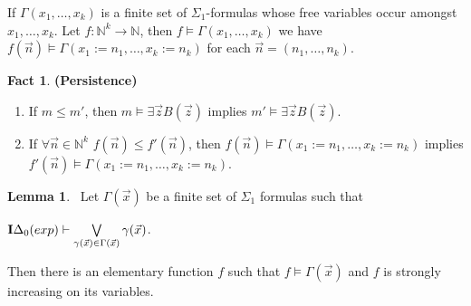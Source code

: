 \documentclass[8pt]{article}
\theoremstyle{definition}
\theoremstyle{definition}
\theoremstyle{definition}
\theoremstyle{definition}
\theoremstyle{definition}
\theoremstyle{definition}
\theoremstyle{definition}
\theoremstyle{definition}
\newtheorem{lemma}{Lemma}[section]
\theoremstyle{definition}
\newtheorem{fact}{Fact}[section]
\theoremstyle{definition}
\theoremstyle{definition}
\theoremstyle{definition}
\theoremstyle{definition}
\theoremstyle{question}
\begin{document}
If $\Gamma(x_1, \dots, x_k)$ is a finite set of $\Sigma_1$-formulas whose free variables occur amongst $x_1, \dots, x_k$.
Let $f : \mathbb{N}^{k} \to \mathbb{N}$, then $f \models \Gamma(x_1, \dots, x_k)$ we have $f(\vec{n}) \models \Gamma(x_1 := n_1, \dots, x_k := n_k)$
for each $\vec{n} = (n_1, \dots, n_k)$.

\begin{fact} {\bf (Persistence)}

  \begin{enumerate}
    \item If $m \leq m'$, then $m \models \exists \vec{z} B(\vec{z})$ implies $m' \models \exists \vec{z} B(\vec{z})$.
    \item If $\forall \vec{n} \in \mathbb{N}^{k}$ $f(\vec{n}) \leq f'(\vec{n})$, 
    then $f(\vec{n}) \models \Gamma(x_1 := n_1, \dots, x_k := n_k)$ implies $f'(\vec{n}) \models \Gamma(x_1 := n_1, \dots, x_k := n_k)$.
  \end{enumerate}
\end{fact}

\begin{lemma}~\label{truth:idelta0}
  Let $\Gamma(\vec{x})$ be a finite set of $\Sigma_1$ formulas such that 
  \begin{center}
  ${\bf I}\Delta_0(exp) \vdash \bigvee \limits_{\gamma(\vec{x}) \in \Gamma(\vec{x})} \gamma(\vec{x})$.
  \end{center}
  Then there is an elementary function $f$ such that $f \models \Gamma(\vec{x})$ and $f$ is strongly increasing on its variables.
\end{lemma}
\end{document}
